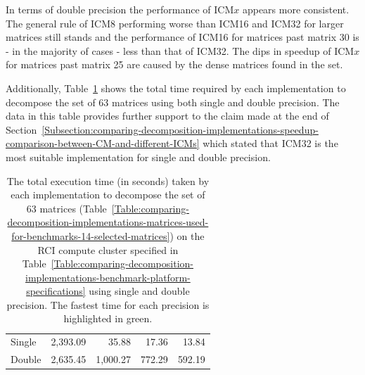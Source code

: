 \par In terms of double precision the performance of ICM$ x $ appears more consistent. The general rule of ICM8 performing worse than ICM16 and ICM32 for larger matrices still stands and the performance of ICM16 for matrices past matrix 30 is - in the majority of cases - less than that of ICM32. The dips in speedup of ICM$ x $ for matrices past matrix 25 are caused by the dense matrices found in the set.

Additionally, Table~\ref{Table:comparing-decomposition-implementations-performance-of-implementations-across-all-matrices-total-execution-time-single-double-precision} shows the total time required by each implementation to decompose the set of 63 matrices using both single and double precision. The data in this table provides further support to the claim made at the end of Section~\ref{Subsection:comparing-decomposition-implementations-speedup-comparison-between-CM-and-different-ICMs} which stated that ICM32 is the most suitable implementation for single and double precision.

\begin{table}[ht!]
	\centering
	\renewcommand{\arraystretch}{1.5}
	\begin{tabular}{|>{\footnotesize}l|>{\raggedleft\arraybackslash\footnotesize}r|>{\raggedleft\arraybackslash\footnotesize}r|>{\raggedleft\arraybackslash\footnotesize}r|>{\raggedleft\arraybackslash\footnotesize}r|}
		\hline
		\multicolumn{1}{|>{\centering\footnotesize}c|}{Matrix} & \multicolumn{1}{>{\centering\footnotesize}c|}{CM} & \multicolumn{1}{>{\centering\footnotesize}c|}{ICM8} & \multicolumn{1}{>{\centering\footnotesize}c|}{ICM16} & \multicolumn{1}{>{\centering\footnotesize}c|}{ICM32} \\ \hline
		Single        & 2,393.09 &    35.88 &  17.36 & \cellcolor{green!25} 13.84 \\
		Double 		  & 2,635.45 & 1,000.27 & 772.29 & \cellcolor{green!25}592.19 \\ \hline
	\end{tabular}
	\caption{The total execution time (in seconds) taken by each implementation to decompose the set of 63 matrices (Table~\ref{Table:comparing-decomposition-implementations-matrices-used-for-benchmarks-14-selected-matrices}) on the RCI compute cluster specified in Table~\ref{Table:comparing-decomposition-implementations-benchmark-platform-specifications} using single and double precision. The fastest time for each precision is highlighted in green.}
	\label{Table:comparing-decomposition-implementations-performance-of-implementations-across-all-matrices-total-execution-time-single-double-precision}
\end{table}

